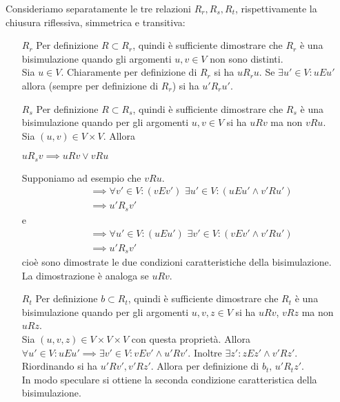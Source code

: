 \begin{proof2}
    Consideriamo separatamente le tre relazioni $R_r, R_s, R_t$, rispettivamente la chiusura riflessiva, simmetrica e transitiva:
    \begin{itemize}
        \item[$R_r$] Per definizione $R \subset R_r$, quindi è sufficiente dimostrare che $R_r$ è una bisimulazione quando gli argomenti $u,v \in V$ non sono distinti.\\
        Sia $u \in V$. Chiaramente per definizione di $R_r$ si ha $u R_r u$. Se $\exists u' \in V: u E u'$ allora (sempre per definizione di $R_r$) si ha $u' R_r u'$.
        \item[$R_s$] Per definizione $R \subset R_s$, quindi è sufficiente dimostrare che $R_s$ è una bisimulazione quando per gli argomenti $u,v \in V$ si ha $u R v$ ma non $v R u$.\\
        Sia $(u,v) \in V\times V$. Allora
        \begin{center}
            $u R_s v \implies u R v \lor v R u$
        \end{center}
        Supponiamo ad esempio che $v R u$.
        \begin{align*}
            &\implies \forall v' \in V: (v E v') \,\,\exists u' \in V: (u E u' \land v' R u')\\
            &\implies u' R_s v'
        \end{align*}
        e
        \begin{align*}
            &\implies \forall u' \in V: (u E u') \,\,\exists v' \in V: (v E v' \land v' R u')\\
            &\implies u' R_s v'
        \end{align*}
        cioè sono dimostrate le due condizioni caratteristiche della bisimulazione.\\
        La dimostrazione è analoga se $u R v$.
        \item[$R_t$] Per definizione $b \subset R_t$, quindi è sufficiente dimostrare che $R_t$ è una bisimulazione quando per gli argomenti $u,v,z \in V$ si ha $u R v$, $v R z$ ma non $u R z$.\\
        Sia $(u,v,z) \in V\times V\times V$ con questa proprietà. Allora $\forall u' \in V: u E u' \implies \exists v' \in V: v E v' \land u' R v'$. Inoltre $\exists z' : z E z' \land v' R z'$.\\
        Riordinando si ha $u' R v', v' R z'$. Allora per definizione di $b_t, \, u' R_t z'$.\\
        In modo speculare si ottiene la seconda condizione caratteristica della bisimulazione.
    \end{itemize}
\end{proof2}
